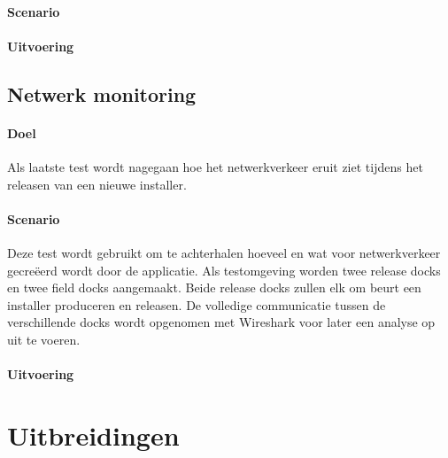 \paragraph{Scenario}


\paragraph{Uitvoering}


\subsection{Netwerk monitoring}
\paragraph{Doel}
Als laatste test wordt nagegaan hoe het netwerkverkeer eruit ziet tijdens het releasen van een nieuwe installer.

\paragraph{Scenario}
Deze test wordt gebruikt om te achterhalen hoeveel en wat voor netwerkverkeer gecreëerd wordt door de applicatie.
Als testomgeving worden twee release docks en twee field docks aangemaakt.
Beide release docks zullen elk om beurt een installer produceren en releasen.
De volledige communicatie tussen de verschillende docks wordt opgenomen met Wireshark voor later een analyse op uit te voeren.

\paragraph{Uitvoering}


\section{Uitbreidingen}



